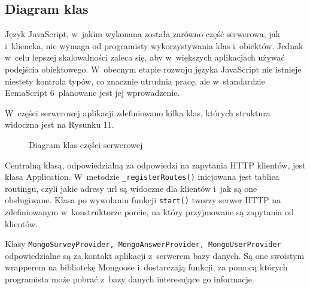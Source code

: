 \documentclass[8pt,a4paper,notitlepage]{article}
\begin{document}
\subsection{Diagram klas}
Język JavaScript, w~jakim wykonana została zarówno część serwerowa, jak i~kliencka, nie wymaga od programisty wykorzystywania klas i~obiektów. Jednak w~celu lepszej skalowalności zaleca się, aby w~większych aplikacjach używać podejścia obiektowego. W~obecnym etapie rozwoju języka JavaScript nie istnieje niestety kontrola typów, co znacznie utrudnia pracę, ale w~standardzie EcmaScript 6~planowane jest jej wprowadzenie.
\par W~części serwerowej aplikacji zdefiniowano kilka klas, których struktura widoczna jest na Rysunku 11.

\begin{figure}[H]
\begin{center}
\caption{Diagram klas części serwerowej}
\end{center}
\end{figure}

\par Centralną klasą, odpowiedzialną za odpowiedzi na zapytania HTTP klientów, jest klasa Application. W~metodzie \texttt{\_registerRoutes()} inicjowana jest tablica routingu, czyli jakie adresy url są widoczne dla klientów i~jak są one obsługiwane. Klasa po wywołaniu funkcji \texttt{start()} tworzy serwer HTTP na zdefiniowanym w~konstruktorze porcie, na który przyjmowane są zapytania od klientów.

\par Klasy \texttt{MongoSurveyProvider, MongoAnswerProvider, MongoUserProvider} odpowiedzialne są za kontakt aplikacji z~serwerem bazy danych. Są one swoistym wrapperem na bibliotekę Mongoose i~dostarczają funkcji, za pomocą których programista może pobrać z~bazy danych interesujące go informacje.
\end{document}
